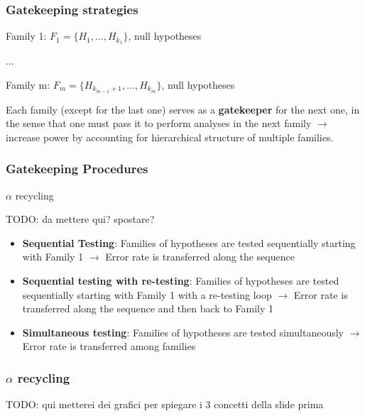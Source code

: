 \documentclass[xcolor={pdftex,dvipsnames,table}]{beamer}
\newcommand{\rbf}[1]{\textcolor{redUnipd}{ #1}}
\begin{document}
\begin{frame}
\frametitle{Gatekeeping strategies}
\rbf{Family 1}:
$F_1 = \{H_1, \dots, H_{k_1}\}$, null hypotheses

$\dots$

\rbf{Family m}:
$F_m = \{H_{k_{m-1} +1}, \dots, H_{k_m}\}$, null hypotheses

\bigskip

Each family (except for the last one) serves as a \textbf{gatekeeper} for the next one, in the sense that one must pass it to perform analyses in the next family $\rightarrow$ increase power by accounting for \rbf{hierarchical} structure of multiple families.
\end{frame}

\begin{frame}
\frametitle{Gatekeeping Procedures}

\rbf{$\alpha$ recycling}

TODO: da mettere qui? spostare?

\begin{itemize}
    \item \textbf{Sequential Testing}: Families of hypotheses are tested sequentially starting with Family 1 $\rightarrow$ Error rate is transferred along the sequence
    \item \textbf{Sequential testing with re-testing}: Families of hypotheses are tested sequentially starting with Family 1 with a re-testing loop $\rightarrow$ Error rate is transferred along the sequence and then back to Family 1
    \item \textbf{Simultaneous testing}: Families of hypotheses are tested simultaneously $\rightarrow$ Error rate is transferred among families
\end{itemize}

    
\end{frame}

\begin{frame}
\frametitle{$\alpha$ recycling}

TODO: qui metterei dei grafici per spiegare i 3 concetti della slide prima
\end{frame}
\end{document}
